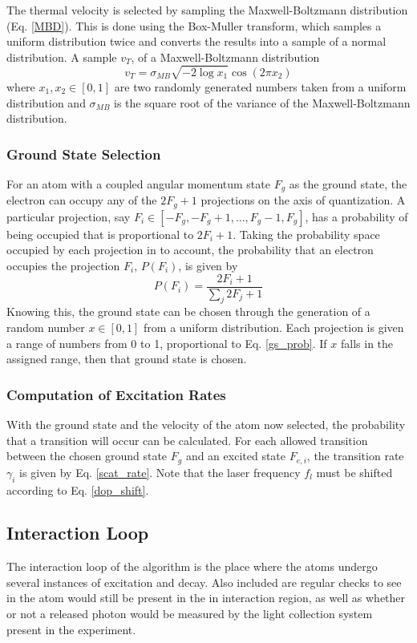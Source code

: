 The thermal velocity is selected by sampling the Maxwell-Boltzmann distribution (Eq. \ref{MBD}). This is done using the Box-Muller transform, which samples a uniform distribution twice and converts the results into a sample of a normal distribution. A sample $v_T$, of a Maxwell-Boltzmann distribution
\begin{equation}
v_T = \sigma_{MB} \sqrt{-2\log x_1}\cos (2\pi x_2)
\end{equation}
where $x_1,x_2 \in [0,1]$ are two randomly generated numbers taken from a uniform distribution and $\sigma_{MB}$ is the square root of the variance of the Maxwell-Boltzmann distribution. 

\subsubsection{Ground State Selection}
For an atom with a coupled angular momentum state $F_g$ as the ground state, the electron can occupy any of the $2F_g+1$ projections on the axis of quantization. A particular projection, say $F_i \in [-F_g,-F_g+1,...,F_g-1,F_g]$, has a probability of being occupied that is proportional to $2F_i+1$. Taking the probability space occupied by each projection in to account, the probability that an electron occupies the projection $F_i$, $P(F_i)$, is given by
\begin{equation}
P(F_i) = \frac{2F_i+1}{\sum_j 2F_j+1}
\label{gs_prob}
\end{equation}
Knowing this, the ground state can be chosen through the generation of a random number $x \in [0,1]$ from a uniform distribution. Each projection is given a range of numbers from 0 to 1, proportional to Eq. \ref{gs_prob}. If $x$ falls in the assigned range, then that ground state is chosen. 

\subsubsection{Computation of Excitation Rates}
With the ground state and the velocity of the atom now selected, the probability that a transition will occur can be calculated. For each allowed transition between the chosen ground state $F_g$ and an excited state $F_{e,i}$, the transition rate $\gamma_i$ is given by Eq. \ref{scat_rate}. Note that the laser frequency $f_l$ must be shifted according to Eq. \ref{dop_shift}.

\subsection{Interaction Loop}
The interaction loop of the algorithm is the place where the atoms undergo several instances of excitation and decay. Also included are regular checks to see in the atom would still be present in the in interaction region, as well as whether or not a released photon would be measured by the light collection system present in the experiment.

